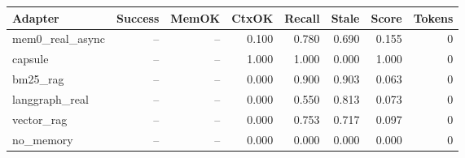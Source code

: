 \begin{tabular}{lrrrrrrr}
\hline
Adapter & Success & MemOK & CtxOK & Recall & Stale & Score & Tokens \\
\hline
mem0\_real\_async & -- & -- & 0.100 & 0.780 & 0.690 & 0.155 & 0 \\
capsule & -- & -- & 1.000 & 1.000 & 0.000 & 1.000 & 0 \\
bm25\_rag & -- & -- & 0.000 & 0.900 & 0.903 & 0.063 & 0 \\
langgraph\_real & -- & -- & 0.000 & 0.550 & 0.813 & 0.073 & 0 \\
vector\_rag & -- & -- & 0.000 & 0.753 & 0.717 & 0.097 & 0 \\
no\_memory & -- & -- & 0.000 & 0.000 & 0.000 & 0.000 & 0 \\
\hline
\end{tabular}
